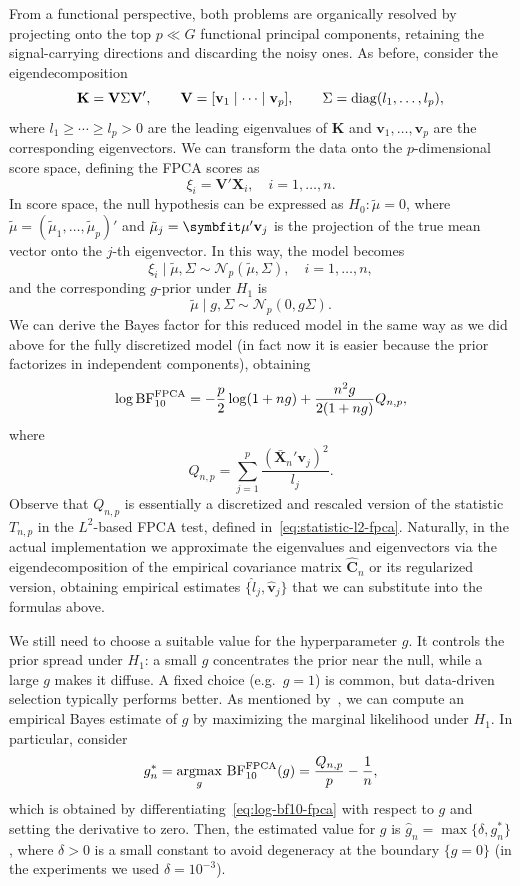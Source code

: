 From a functional perspective, both problems are organically resolved by projecting onto the top \(p\ll G\) functional principal components, retaining the signal-carrying directions and discarding the noisy ones. As before, consider the eigendecomposition
\[
\mathbf K = \mathbf V \Sigma \mathbf V', \qquad \mathbf V = [\mathbf v_1 \mid \cdots \mid \mathbf v_p], \qquad \Sigma = \operatorname{diag}(l_1,\dots, l_p),
\]
where \(l_1 \geq \cdots \geq l_p > 0\) are the leading eigenvalues of \(\mathbf K\) and \(\mathbf v_1,\dots, \mathbf v_p\) are the corresponding eigenvectors. We can transform the data onto the \(p\)-dimensional score space, defining the \acs{FPCA} scores as
\[
\xi_i = \mathbf V' \mathbf X_i, \quad i=1,\dots,n.
\]
In score space, the null hypothesis can be expressed as \(H_0: \tilde{\mu}=0\), where \(\tilde{\mu}=(\tilde \mu_1,\dots, \tilde \mu_p)'\) and \(\tilde \mu_j = \symbfit \mu' \mathbf v_j\) is the projection of the true mean vector onto the \(j\)-th eigenvector. In this way, the model becomes
\[
\xi_i\mid \tilde{\mu}, \Sigma \sim \mathcal N_p(\tilde{\mu}, \Sigma), \quad i=1,\dots,n,
\]
and the corresponding \(g\)-prior under \(H_1\) is
\[
\tilde{\mu}\mid g, \Sigma \sim \mathcal N_p(0, g\Sigma).
\]
We can derive the Bayes factor for this reduced model in the same way as we did above for the fully discretized model (in fact now it is easier because the prior factorizes in independent components), obtaining
\begin{equation}\label{eq:log-bf10-fpca}
\log \operatorname{\text{BF}}_{10}^{\text{FPCA}} = -\frac{p}{2}\log(1+ng) + \frac{n^2 g}{2(1+ng)} Q_{n,p},
\end{equation}
where 
\[
Q_{n,p} = \sum_{j=1}^p \frac{(\bar {\mathbf X}_n' \mathbf v_j)^2}{l_j}.
\]
Observe that \(Q_{n,p}\) is essentially a discretized and rescaled version of the statistic \(T_{n,p}\) in the \(L^2\)-based \acs{FPCA} test, defined in~\eqref{eq:statistic-l2-fpca}. Naturally, in the actual implementation we approximate the eigenvalues and eigenvectors via the eigendecomposition of the empirical covariance matrix \(\hat {\mathbf C}_n\) or its regularized version, obtaining empirical estimates \(\{\hat l_j, \hat{\mathbf v}_j\}\) that we can substitute into the formulas above.

We still need to choose a suitable value for the hyperparameter \(g\). It controls the prior spread under \(H_1\): a small \(g\) concentrates the prior near the null, while a large \(g\) makes it diffuse. A fixed choice (e.g.\ \(g=1\)) is common, but data-driven selection typically performs better. As mentioned by~\citet{liang2008mixtures}, we can compute an empirical Bayes estimate of \(g\) by maximizing the marginal likelihood under \(H_1\). In particular, consider
\[
g^*_n = \operatorname*{argmax}_g\, \operatorname{\text{BF}}_{10}^{\text{FPCA}}(g) = \frac{Q_{n,p}}{p} - \frac{1}{n},
\]
which is obtained by differentiating~\eqref{eq:log-bf10-fpca} with respect to \(g\) and setting the derivative to zero. Then, the estimated value for \(g\) is \(\hat g_n = \max\{\delta, g^*_n\}\), where \(\delta>0\) is a small constant to avoid degeneracy at the boundary \(\{g=0\}\) (in the experiments we used \(\delta=10^{-3}\)).

